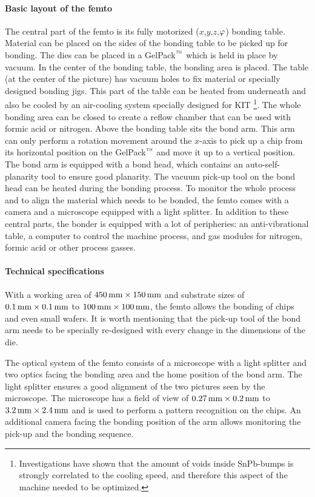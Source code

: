 \paragraph*{Basic layout of the femto}
The central part of the femto is its fully motorized ($x$,$y$,$z$,$\rm{\varphi}$) bonding table. Material can be placed on the sides of the bonding table to be picked up for bonding. The dies can be placed in a GelPack$\rm{\symbTM}$ which is held in place by vacuum. In the center of the bonding table, the bonding area is placed. The table (at the center of the picture) has vacuum holes to fix material or specially designed bonding jigs. This part of the table can be heated from underneath and also be cooled by an air-cooling system specially designed for \ac{KIT} \footnote{Investigations have shown that the amount of voids inside SnPb-bumps is strongly correlated to the cooling speed, and therefore this aspect of the machine needed to be optimized.}. The whole bonding area can be closed to create a reflow chamber that can be used with formic acid or nitrogen. Above the bonding table sits the bond arm. This arm can only perform a rotation movement around the $x$-axis to pick up a chip from its horizontal position on the GelPack$\rm{\symbTM}$ and move it up to a vertical position. The bond arm is equipped with a bond head, which contains an auto-self-planarity tool to ensure good planarity. The vacuum pick-up tool on the bond head can be heated during the bonding process. To monitor the whole process and to align the material which needs to be bonded, the femto comes with a camera and a microscope equipped with a light splitter. In addition to these central parts, the bonder is equipped with a lot of peripheries: an anti-vibrational table, a computer to control the machine process, and gas modules for nitrogen, formic acid or other process gasses.

\paragraph*{Technical specifications}
With a working area of $450\,\rm{mm}\times 150\,\rm{mm}$ and substrate sizes of $0.1\,\rm{mm}\times 0.1\,\rm{mm}$ to $100\,\rm{mm}\times 100\,\rm{mm}$, the femto allows the bonding of chips and even small wafers. It is worth mentioning that the pick-up tool of the bond arm needs to be specially re-designed with every change in the dimensions of the die.

The optical system of the femto consists of a microscope with a light splitter and two optics facing the bonding area and the home position of the bond arm. The light splitter ensures a good alignment of the two pictures seen by the microscope. The microscope has a field of view of $0.27\,\rm{mm}\times 0.2\,\rm{mm}$ to $3.2\,\rm{mm}\times 2.4\,\rm{mm}$ and is used to perform a pattern recognition on the chips. An additional camera facing the bonding position of the arm allows monitoring the pick-up and the bonding sequence.

